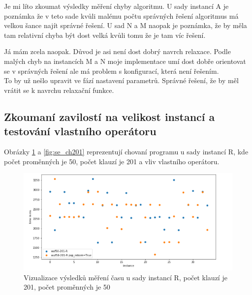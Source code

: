 \documentclass{article}
\begin{document}
Je mi líto zkoumat výsledky měření chyby algoritmu. U sady instancí A je poznámka že v teto sade kvůli malému počtu správných řešení algoritmus má velkou šance najít správné řešení. U sad N a M naopak je poznámka, že by měla tam relativní chyba být dost velká kvůli tomu že je tam víc řešení.

Já mám zcela naopak. Důvod je asi není dost dobrý navrch relaxace. Podle malých chyb na instancích M a N moje implementace umí dost dobře orientovat se v správných řešení ale má problem s konfigurací, která není řešením.\\

To by už nešlo upravit ve fází nastavení parametrů. Správné řešení, že by měl vrátit se k navrchu relaxační funkce.
\newpage
\subsection{Zkoumaní zavilostí na velikost instancí a testování vlastního operátoru}

Obrázky \ref{fig:se_t201} a \ref{fig:se_ch201} reprezentují chovaní programu u sady instancí R, kde počet proměnných je 50, počet klauzí je 201 a vliv vlastního operátoru.

\begin{figure}[H]
    \centering
    \includegraphics[width=1.1\textwidth]{screenshot_1296}
    \caption{Vizualizace výsledků měření času u sady instancí R, počet klauzí je 201, počet proměnných je 50}
    \label{fig:se_t201}
\end{figure}
\end{document}

